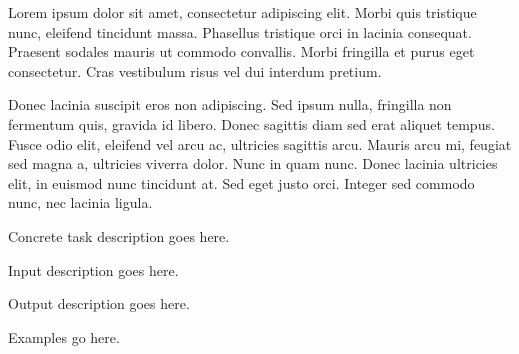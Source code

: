 \documentclass{boi2014}
\author{Example Author}
\begin{document}
Lorem ipsum dolor sit amet, consectetur adipiscing elit. Morbi quis tristique nunc, eleifend tincidunt massa. Phasellus tristique orci in lacinia consequat. Praesent sodales mauris ut commodo convallis. Morbi fringilla et purus eget consectetur. Cras vestibulum risus vel dui interdum pretium.

Donec lacinia suscipit eros non adipiscing. Sed ipsum nulla, fringilla non fermentum quis, gravida id libero. Donec sagittis diam sed erat aliquet tempus. Fusce odio elit, eleifend vel arcu ac, ultricies sagittis arcu. Mauris arcu mi, feugiat sed magna a, ultricies viverra dolor. Nunc in quam nunc. Donec lacinia ultricies elit, in euismod nunc tincidunt at. Sed eget justo orci. Integer sed commodo nunc, nec lacinia ligula.

\Task
Concrete task description goes here.

\Input
Input description goes here.

\Output
Output description goes here.

\Examples
Examples go here.
\end{document}
